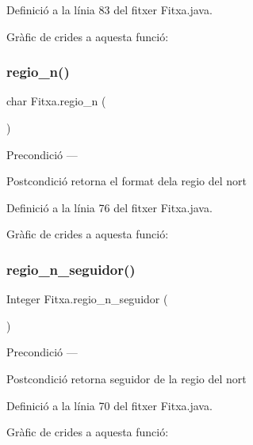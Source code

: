 Definició a la línia 83 del fitxer Fitxa.\+java.

Gràfic de crides a aquesta funció\+:
\mbox{\label{class_fitxa_a624bc5406355ecd57d98a8f88b919d7d}} 
\subsubsection{\texorpdfstring{regio\+\_\+n()}{regio\_n()}}
{\footnotesize\ttfamily char Fitxa.\+regio\+\_\+n (\begin{DoxyParamCaption}{ }\end{DoxyParamCaption})}

\begin{DoxyPrecond}{Precondició}
--- 
\end{DoxyPrecond}
\begin{DoxyPostcond}{Postcondició}
retorna el format dela regio del nort 
\end{DoxyPostcond}


Definició a la línia 76 del fitxer Fitxa.\+java.

Gràfic de crides a aquesta funció\+:
\mbox{\label{class_fitxa_a280bc89f067a6aafd918064caf88333a}} 
\subsubsection{\texorpdfstring{regio\+\_\+n\+\_\+seguidor()}{regio\_n\_seguidor()}}
{\footnotesize\ttfamily Integer Fitxa.\+regio\+\_\+n\+\_\+seguidor (\begin{DoxyParamCaption}{ }\end{DoxyParamCaption})}

\begin{DoxyPrecond}{Precondició}
--- 
\end{DoxyPrecond}
\begin{DoxyPostcond}{Postcondició}
retorna seguidor de la regio del nort 
\end{DoxyPostcond}


Definició a la línia 70 del fitxer Fitxa.\+java.

Gràfic de crides a aquesta funció\+:
\mbox{\label{class_fitxa_a821a56526407eb83f0d83ae091de0474}} 
